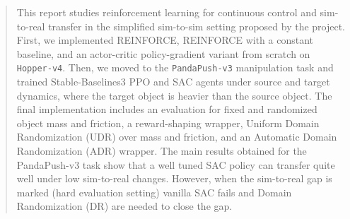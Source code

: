 \begin{abstract}
This report studies reinforcement learning for continuous
 control and sim-to-real transfer in the simplified sim-to-sim setting proposed by the project. First, we implemented REINFORCE, REINFORCE with a constant baseline, and an actor-critic policy-gradient variant from scratch on \texttt{Hopper-v4}. Then, we moved to the \texttt{PandaPush-v3} manipulation task and trained Stable-Baselines3 PPO and SAC agents under source and target dynamics, where the target object is heavier than the source object. The final implementation includes an evaluation for fixed and randomized object mass and friction, a reward-shaping wrapper, Uniform Domain Randomization (UDR) over mass and friction, and an Automatic Domain Randomization (ADR) wrapper. 
 The main results obtained for the PandaPush-v3 task show that a well tuned SAC policy can transfer quite well under low sim-to-real changes. 
 However, when the sim-to-real gap is marked (hard evaluation setting) vanilla SAC fails and Domain Randomization (DR) are needed to close the gap.

\end{abstract}
